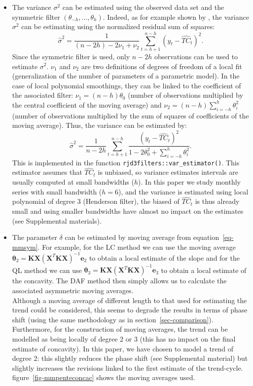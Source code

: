 \documentclass[
]{article}
\newcommand\transp[1]{{#1}^T}
\newcommand\1{\mathds{1}}
\begin{document}
\begin{itemize}
\item
  The variance \(\sigma^2\) can be estimated using the observed data set
  and the symmetric filter \((\theta_{-h},\dots,\theta_h)\). Indeed, as
  for example shown by \textcite{Loader1999}, the variance \(\sigma^2\)
  can be estimating using the normalized residual sum of squares: \[
  \hat\sigma^2=\frac{1}{(n-2h)-2\nu_1+\nu_2}\sum_{t=h+1}^{n-h}(y_t-\widehat{TC}_t)^2.
  \] Since the symmetric filter is used, only \(n-2h\) observations can
  be used to estimate \(\sigma^2\). \(\nu_1\) and \(\nu_2\) are two
  definitions of degrees of freedom of a local fit (generalization of
  the number of parameters of a parametric model). In the case of local
  polynomial smoothings, they can be linked to the coefficient of the
  associated filter: \(\nu_1 = (n-h)\theta_0\) (number of observations
  multiplied by the central coefficient of the moving average) and
  \(\nu_2 = (n-h)\sum_{i=-h}^{h} \theta_i^2\) (number of observations
  multiplied by the sum of squares of coefficients of the moving
  average). Thus, the variance can be estimated by: \[
  \hat\sigma^2=\frac{1}{n-2h}\sum_{t=h+1}^{n-h}\frac{(y_t-\widehat{TC}_t)^2}{1-2\theta_0^2+\sum_{i=-h}^{h} \theta_i^2}.
  \] This is implemented in the function
  \texttt{rjd3filters::var\_estimator()}. This estimator assumes that
  \(\widehat{TC}_t\) is unbiased, so variance estimates intervals are
  usually computed at small bandwidths (\(h\)). In this paper we study
  monthly series with small bandwidth (\(h=6\)), and the variance is
  estimated using local polynomial of degree 3 (Henderson filter), the
  biased of \(\widehat{TC}_t\) is thus already small and using smaller
  bandwidths have almost no impact on the estimates (see Supplemental
  materials).
\item
  The parameter \(\delta\) can be estimated by moving average from
  equation~\ref{eq-mmsym}. For example, for the LC method we can use the
  moving average
  \(\boldsymbol \theta_2=\boldsymbol K\boldsymbol X(\transp{\boldsymbol X}\boldsymbol K\boldsymbol X)^{-1}\boldsymbol e_{2}\)
  to obtain a local estimate of the slope and for the QL method we can
  use
  \(\boldsymbol \theta_3=\boldsymbol K\boldsymbol X(\transp{\boldsymbol X}\boldsymbol K\boldsymbol X)^{-1}\boldsymbol e_{3}\)
  to obtain a local estimate of the concavity. The DAF method then
  simply allows us to calculate the associated asymmetric moving
  averages.\\
  Although a moving average of different length to that used for
  estimating the trend could be considered, this seems to degrade the
  results in terms of phase shift (using the same methodology as in
  section~\ref{sec-comparison}). Furthermore, for the construction of
  moving averages, the trend can be modelled as being locally of degree
  2 or 3 (this has no impact on the final estimate of concavity). In
  this paper, we have chosen to model a trend of degree 2: this slightly
  reduces the phase shift (see Supplemental material) but slightly
  increases the revisions linked to the first estimate of the
  trend-cycle. figure~\ref{fig-mmpenteconcac} shows the moving averages
  used.
\end{itemize}
\end{document}
